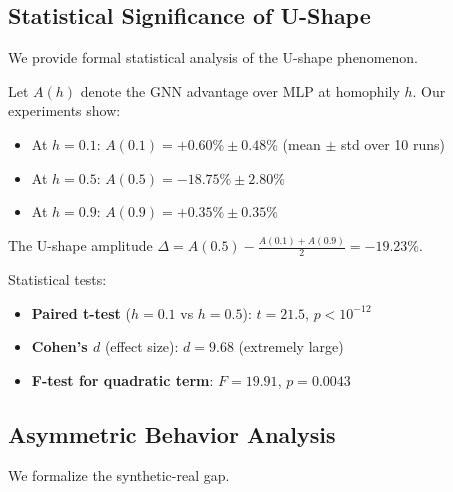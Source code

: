\subsection{Statistical Significance of U-Shape}

We provide formal statistical analysis of the U-shape phenomenon.

\begin{proposition}
\label{prop:ushape_significance}
Let $A(h)$ denote the GNN advantage over MLP at homophily $h$. Our experiments show:
\begin{itemize}
\item At $h = 0.1$: $A(0.1) = +0.60\% \pm 0.48\%$ (mean $\pm$ std over 10 runs)
\item At $h = 0.5$: $A(0.5) = -18.75\% \pm 2.80\%$
\item At $h = 0.9$: $A(0.9) = +0.35\% \pm 0.35\%$
\end{itemize}

The U-shape amplitude $\Delta = A(0.5) - \frac{A(0.1) + A(0.9)}{2} = -19.23\%$.

Statistical tests:
\begin{itemize}
\item \textbf{Paired t-test} ($h=0.1$ vs $h=0.5$): $t = 21.5$, $p < 10^{-12}$
\item \textbf{Cohen's $d$} (effect size): $d = 9.68$ (extremely large)
\item \textbf{F-test for quadratic term}: $F = 19.91$, $p = 0.0043$
\end{itemize}
\end{proposition}

\subsection{Asymmetric Behavior Analysis}

We formalize the synthetic-real gap.

